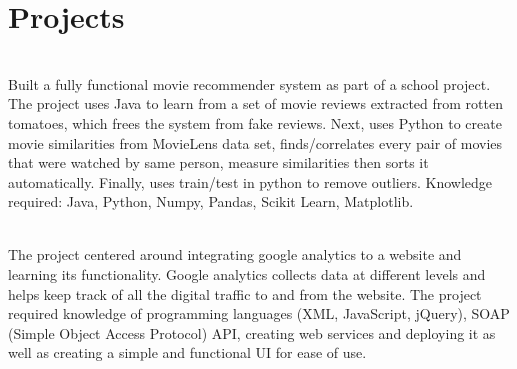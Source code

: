 \documentclass[]{deedy-resume-openfont}
\begin{document}
\begin{minipage}[t]{0.71\textwidth} 


\section{Projects}
\\
Built a fully functional movie recommender system as part of a school project. The project uses Java to learn from a set of movie reviews extracted from rotten tomatoes, which frees the system from fake reviews. Next, uses Python to create movie similarities from MovieLens data set, finds/correlates every pair of movies that were watched by same person, measure similarities then sorts it automatically. Finally, uses train/test in
python to remove outliers. Knowledge required: Java, Python, Numpy, Pandas, Scikit Learn, 
Mat\medskip plotlib.  

 \\
The project centered around integrating google analytics to a website and learning its functionality. Google analytics collects data
at different levels and helps keep track of all the digital traffic to and from the website. The project required knowledge of programming languages (XML, JavaScript, jQuery), SOAP (Simple Object Access Protocol) API, creating web services and deploying it as well as creating a simple and functional UI for ease of use.

\sectionsep

\vspace*{-\baselineskip}
\medskip

\end{minipage}
\end{document}
